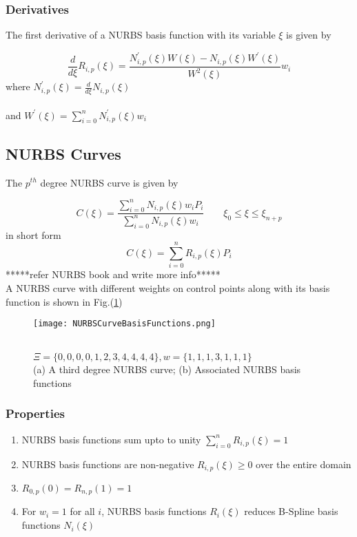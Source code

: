 \documentclass[11pt]{article}
\begin{document}
\subsubsection{Derivatives}
The first derivative of a NURBS basis function with its variable $\xi$ is given
by

\begin{equation}
\frac{d }{d \xi} R_{i,p}(\xi) = \frac{N^{'}_{i,p}(\xi)  W(\xi) - N_{i,p}(\xi) 
	W^{'}(\xi)}{W^{2}(\xi)}w_{i}
\end{equation}
\noindent
where
$N^{'}_{i,p}(\xi) = \frac{d }{d \xi} N_{i,p}(\xi)$  \\
\\
\noindent
and $W^{'}(\xi) =  \sum_{i=0}^{n}N^{'}_{i,p}(\xi) w_i$


\subsection{NURBS Curves }
The $p^{th}$ degree NURBS curve is given by

\begin{equation}
C(\xi) =
\frac{\sum_{i=0}^{n}N_{i,p}(\xi)w_{i}P_{i}}{\sum_{i=0}^{n}N_{i,p}(\xi)w_{i}}
\qquad \xi_0 \leq \xi \leq \xi_{n+p}
\end{equation}
in short form
\begin{equation}
C(\xi) = \sum_{i=0}^{n}R_{i,p}(\xi)P_{i}
\end{equation}
*****refer NURBS book and write more info*****\\
A NURBS curve with different weights on control points along with its basis function is shown in Fig.(\ref{NURBSCurveBasisFunctions})
\begin{figure}[H]
	\begin{center}
		\texttt{[image: NURBSCurveBasisFunctions.png]} 
		\caption{\\$\Xi=\{0,0,0,0,1,2,3,4,4,4,4\}, w = \{1,1,1,3,1,1,1\}$\\(a) A third degree NURBS curve; (b) Associated NURBS basis functions}\label{NURBSCurveBasisFunctions}
	\end{center}	
\end{figure}
\subsubsection{Properties }
\begin{enumerate}
	\item NURBS basis functions sum upto to unity $\sum_{i=0}^{n} R_{i,p}(\xi) =1$
	\item NURBS basis functions are non-negative $ R_{i,p}(\xi) \geq 0$ over the entire
	domain
	\item $R_{0,p}(0)=R_{n,p}(1)=1$
	\item For $w_i=1$ for all $i$, NURBS basis functions $R_i(\xi)$ reduces B-Spline basis functions $N_i(\xi)$ 
\end{enumerate}
\end{document}

